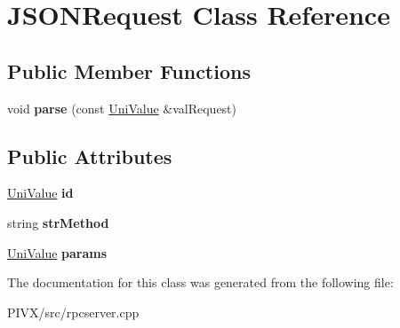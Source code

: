 \hypertarget{class_j_s_o_n_request}{}\section{J\+S\+O\+N\+Request Class Reference}
\label{class_j_s_o_n_request}
\subsection*{Public Member Functions}
\begin{DoxyCompactItemize}
\item 
\mbox{\label{class_j_s_o_n_request_a728d6b823679ab6466c127402f940eea}} 
void {\bfseries parse} (const \mbox{\hyperlink{class_uni_value}{Uni\+Value}} \&val\+Request)
\end{DoxyCompactItemize}
\subsection*{Public Attributes}
\begin{DoxyCompactItemize}
\item 
\mbox{\label{class_j_s_o_n_request_a718f01139a587532dad68351941a8c37}} 
\mbox{\hyperlink{class_uni_value}{Uni\+Value}} {\bfseries id}
\item 
\mbox{\label{class_j_s_o_n_request_ace58495b259be69fb4b6e256a42c9d5f}} 
string {\bfseries str\+Method}
\item 
\mbox{\label{class_j_s_o_n_request_ae5820a9e4683722804d572223d2fb860}} 
\mbox{\hyperlink{class_uni_value}{Uni\+Value}} {\bfseries params}
\end{DoxyCompactItemize}


The documentation for this class was generated from the following file\+:\begin{DoxyCompactItemize}
\item 
P\+I\+V\+X/src/rpcserver.\+cpp\end{DoxyCompactItemize}
